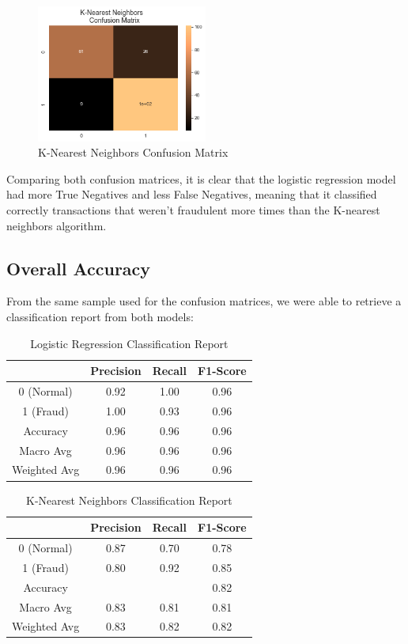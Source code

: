 \documentclass[conference]{IEEEtran}
\begin{document}
\begin{figure}[H]
    \centering\includegraphics[width=0.5\textwidth]{images/kn_conf_matrix.png}
    \caption{K-Nearest Neighbors Confusion Matrix}
    \label{fig:kn_matrix}
\end{figure}

Comparing both confusion matrices, it is clear that the logistic regression model had more True Negatives and less False Negatives, meaning that it classified correctly transactions that weren't fraudulent more times than the K-nearest neighbors algorithm.

\subsection{Overall Accuracy}

From the same sample used for the confusion matrices, we were able to retrieve a classification report from both models:

\begin{table}[H]
\caption{Logistic Regression Classification Report}
\begin{center}
\begin{tabular}{|c|c|c|c|}
\hline
\textbf{} & \textbf{Precision} & \textbf{Recall}& \textbf{F1-Score} \\
\hline
0 (Normal) & 0.92 & 1.00 & 0.96 \\
1 (Fraud) & 1.00 & 0.93 & 0.96 \\
Accuracy & 0.96 & 0.96 & 0.96 \\
Macro Avg & 0.96 & 0.96 & 0.96 \\
Weighted Avg & 0.96 & 0.96 & 0.96 \\
\hline
\end{tabular}
\end{center}
\end{table}


\begin{table}[H]
\caption{K-Nearest Neighbors Classification Report}
\begin{center}
\begin{tabular}{|c|c|c|c|}
\hline
\textbf{} & \textbf{Precision} & \textbf{Recall}& \textbf{F1-Score} \\
\hline
0 (Normal) & 0.87 & 0.70 & 0.78 \\
1 (Fraud) & 0.80 & 0.92 & 0.85 \\
Accuracy & & & 0.82 \\
Macro Avg & 0.83 & 0.81 & 0.81 \\
Weighted Avg & 0.83 & 0.82 & 0.82 \\
\hline
\end{tabular}
\end{center}
\end{table}
\end{document}
